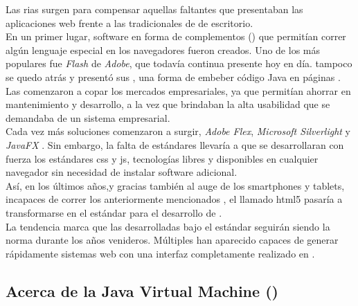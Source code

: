 Las \glspl{ria} surgen para compensar aquellas faltantes que
presentaban las aplicaciones web frente a las tradicionales de \clientserver de
escritorio.\\
En un primer lugar, software en forma de complementos (\plugins) que permitían correr
algún lenguaje especial en los navegadores
fueron creados. Uno de los más populares fue \emph{Flash} de \emph{Adobe}, que todavía
continua presente hoy en día. \java tampoco se quedo atrás y presentó sus \servlets,
una forma de embeber código Java en páginas \html.\\
Las \ria comenzaron a copar los mercados empresariales, ya que permitían ahorrar
en mantenimiento y desarrollo, a la vez que brindaban la alta usabilidad que se demandaba
de un sistema empresarial.\\
Cada vez más soluciones comenzaron a surgir, \emph{Adobe Flex},
\emph{Microsoft Silverlight} y \emph{JavaFX} . Sin embargo, la
falta de estándares llevaría a que se desarrollaran con fuerza los estándares \gls{css} y
\gls{js}, tecnologías libres y disponibles en cualquier navegador sin necesidad de
instalar software adicional.\\
Así, en los últimos años,y gracias también al auge de los smartphones y tablets, incapaces
de correr los anteriormente mencionados \plugins, el llamado \gls{html5}
pasaría a transformarse en el estándar para el desarrollo de \rias
{}.\\
La tendencia marca que las \rias desarrolladas bajo el estándar \htmlv seguirán siendo la
norma durante los años venideros. Múltiples \frameworks han aparecido capaces de generar
rápidamente sistemas web con una interfaz completamente realizado en \htmlv.\\



\subsection{Acerca de la Java Virtual Machine (\jvm)}
\label{subsec:intro:about_jvm}

